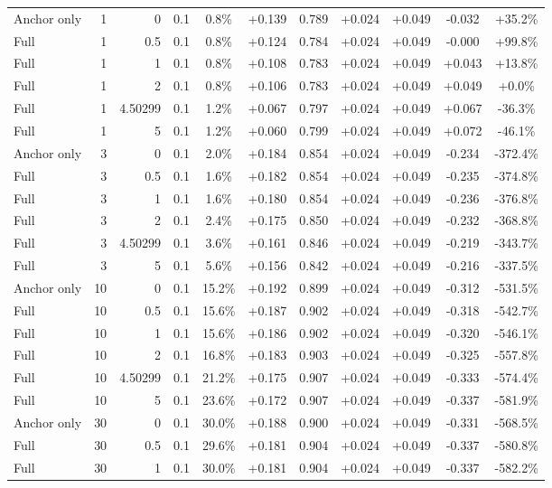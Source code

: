 \begin{table}[htbp]
\begin{tabular}{lrrrccccccc}
Anchor only & 1 & 0 & 0.1 & 0.8\% & +0.139 & 0.789 & +0.024 & +0.049 & -0.032 & +35.2\% \\
Full & 1 & 0.5 & 0.1 & 0.8\% & +0.124 & 0.784 & +0.024 & +0.049 & -0.000 & +99.8\% \\
Full & 1 & 1 & 0.1 & 0.8\% & +0.108 & 0.783 & +0.024 & +0.049 & +0.043 & +13.8\% \\
Full & 1 & 2 & 0.1 & 0.8\% & +0.106 & 0.783 & +0.024 & +0.049 & +0.049 & +0.0\% \\
Full & 1 & 4.50299 & 0.1 & 1.2\% & +0.067 & 0.797 & +0.024 & +0.049 & +0.067 & -36.3\% \\
Full & 1 & 5 & 0.1 & 1.2\% & +0.060 & 0.799 & +0.024 & +0.049 & +0.072 & -46.1\% \\
Anchor only & 3 & 0 & 0.1 & 2.0\% & +0.184 & 0.854 & +0.024 & +0.049 & -0.234 & -372.4\% \\
Full & 3 & 0.5 & 0.1 & 1.6\% & +0.182 & 0.854 & +0.024 & +0.049 & -0.235 & -374.8\% \\
Full & 3 & 1 & 0.1 & 1.6\% & +0.180 & 0.854 & +0.024 & +0.049 & -0.236 & -376.8\% \\
Full & 3 & 2 & 0.1 & 2.4\% & +0.175 & 0.850 & +0.024 & +0.049 & -0.232 & -368.8\% \\
Full & 3 & 4.50299 & 0.1 & 3.6\% & +0.161 & 0.846 & +0.024 & +0.049 & -0.219 & -343.7\% \\
Full & 3 & 5 & 0.1 & 5.6\% & +0.156 & 0.842 & +0.024 & +0.049 & -0.216 & -337.5\% \\
Anchor only & 10 & 0 & 0.1 & 15.2\% & +0.192 & 0.899 & +0.024 & +0.049 & -0.312 & -531.5\% \\
Full & 10 & 0.5 & 0.1 & 15.6\% & +0.187 & 0.902 & +0.024 & +0.049 & -0.318 & -542.7\% \\
Full & 10 & 1 & 0.1 & 15.6\% & +0.186 & 0.902 & +0.024 & +0.049 & -0.320 & -546.1\% \\
Full & 10 & 2 & 0.1 & 16.8\% & +0.183 & 0.903 & +0.024 & +0.049 & -0.325 & -557.8\% \\
Full & 10 & 4.50299 & 0.1 & 21.2\% & +0.175 & 0.907 & +0.024 & +0.049 & -0.333 & -574.4\% \\
Full & 10 & 5 & 0.1 & 23.6\% & +0.172 & 0.907 & +0.024 & +0.049 & -0.337 & -581.9\% \\
Anchor only & 30 & 0 & 0.1 & 30.0\% & +0.188 & 0.900 & +0.024 & +0.049 & -0.331 & -568.5\% \\
Full & 30 & 0.5 & 0.1 & 29.6\% & +0.181 & 0.904 & +0.024 & +0.049 & -0.337 & -580.8\% \\
Full & 30 & 1 & 0.1 & 30.0\% & +0.181 & 0.904 & +0.024 & +0.049 & -0.337 & -582.2\% \\

\end{tabular}
\end{table}
